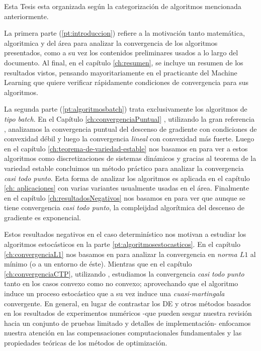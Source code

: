 Esta Tesis esta organizada seg\'un la categorizaci\'on de algoritmos mencionada anteriormente.

La primera parte (\ref{pt:introduccion}) refiere a la motivaci\'on tanto matem\'atica, algoritmica y del \'area para analizar la convergencia de los algoritmos presentados, como a su vez los contenidos preliminares usados a lo largo del documento. Al final, en el cap\'itulo \ref{ch:resumen}, se incluye un resumen de los resultados vistos, pensando mayoritariamente  en el practicante del Machine Learning que quiere verificar r\'apidamente condiciones de convergencia para sus algoritmos.

La segunda parte (\ref{pt:algoritmosbatch}) trata exclusivamente los algoritmos de \textit{tipo batch}. En el Cap\'itulo \ref{ch:convergenciaPuntual} , utilizando la gran referencia \cite{nesterov:2004}, analizamos la convergencia puntual del descenso de gradiente con condiciones de convexidad d\'ebil y luego la convergencia \textit{lineal} con convexidad m\'as fuerte. Luego en el cap\'itulo \ref{ch:teorema-de-variedad-estable} nos basamos en \cite{lee:2017} para ver a estos algoritmos como discretizaciones de sistemas din\'amicos y gracias al teorema de la variedad estable concluimos un m\'etodo pr\'actico para analizar la convergencia \textit{casi todo punto}. Esta forma de analizar los algoritmos es aplicada en el cap\'itulo \ref{ch: aplicaciones} con varias variantes usualmente usadas en el \'area. Finalmente en el cap\'itulo \ref{ch:resultadosNegativos} nos basamos en \cite{du:2017} para ver que aunque se tiene convergencia \textit{casi todo punto}, la compleijdad algor\'itmica del descenso de gradiente es exponencial.

Estos resultados negativos en el caso determin\'istico nos motivan a estudiar los algoritmos estoc\'asticos en la parte \ref{pt:algoritmosestocasticos}. En el cap\'itulo \ref{ch:convergenciaL1} nos basamos en \cite{bottou:2016} para analizar la convergencia en \textit{norma $L1$} al m\'inimo (o a un entorno de \'este). Mientras que en el cap\'itulo \ref{ch:convergenciaCTP}, utilizando \cite{bottou:1999}, estudiamos la convergencia \textit{casi todo punto} tanto en los casos convexo como no convexo; aprovechando que el algoritmo induce un proceso estoc\'astico que a su vez induce una \textit{cuasi-martingala} convergente. En general, en lugar de contrastar los DE y otros m\'etodos basados en los resultados de experimentos num\'ericos -que pueden sesgar nuestra revisi\'on hacia un conjunto de pruebas limitado y detalles de implementaci\'on- enfocamos nuestra atenci\'on en las compensaciones computacionales fundamentales y las propiedades te\'oricas de los m\'etodos de optimizaci\'on.